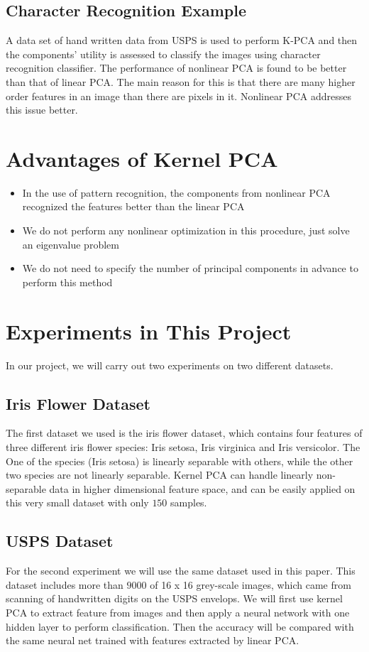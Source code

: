 \subsection{Character Recognition Example}
A data set of hand written data from USPS is used to perform K-PCA and then the components’ utility is assessed to classify the images using character recognition classifier. The performance of nonlinear PCA is found to be better than that of linear PCA. The main reason for this is that there are many higher order features in an image than there are pixels in it. Nonlinear PCA addresses this issue better.

\section{Advantages of Kernel PCA}

\begin{itemize}
  \item In the use of pattern recognition, the components from nonlinear PCA recognized the features better than the linear PCA
  \item We do not perform any nonlinear optimization in this procedure, just solve an eigenvalue problem
  \item We do not need to specify the number of principal components in advance to perform this method
\end{itemize}


\section{Experiments in This Project}

In our project, we will carry out two experiments on two different datasets.

\subsection{Iris Flower Dataset}
The first dataset we used is the iris flower dataset, which contains four features of three different iris flower species: Iris setosa, Iris virginica and Iris versicolor. The One of the species (Iris setosa) is linearly separable with others, while the other two species are not linearly separable. Kernel PCA can handle linearly non-separable data in higher dimensional feature space, and can be easily applied on this very small dataset with only $150$ samples.

\subsection{USPS Dataset}
For the second experiment we will use the same dataset used in this paper. This dataset includes more than $9000$ of 16 x 16 grey-scale images, which came from scanning of handwritten digits on the USPS envelops. We will first use kernel PCA to extract feature from images and then apply a neural network with one hidden layer to perform classification. Then the accuracy will be compared with the same neural net trained with features extracted by linear PCA.
\clearpage

%
%
%



